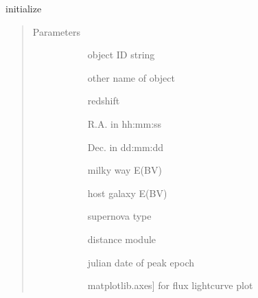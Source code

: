 \documentclass[letterpaper,10pt,english]{sphinxmanual}
\begin{document}
\begin{fulllineitems}
\begin{fulllineitems}
\label{\detokenize{generated/sdapy.snerun.snobject:sdapy.snerun.snobject.__init__}}
initialize 
\begin{quote}\begin{description}
\item[{Parameters}] \leavevmode\begin{description}
\item[{}] \leavevmode{[}\sphinxtitleref{str}{]}
object ID string

\item[{}] \leavevmode{[}\sphinxtitleref{str}{]}
other name of object

\item[{}] \leavevmode{[}\sphinxtitleref{float}{]}
redshift

\item[{}] \leavevmode{[}\sphinxtitleref{str}{]}
R.A. in hh:mm:ss

\item[{}] \leavevmode{[}\sphinxtitleref{str}{]}
Dec. in dd:mm:dd

\item[{}] \leavevmode{[}\sphinxtitleref{float}{]}
milky way E(B\sphinxhyphen{}V)

\item[{}] \leavevmode{[}\sphinxtitleref{float}{]}
host galaxy E(B\sphinxhyphen{}V)

\item[{}] \leavevmode{[}\sphinxtitleref{str}{]}
supernova type

\item[{}] \leavevmode{[}\sphinxtitleref{float}{]}
distance module

\item[{}] \leavevmode{[}\sphinxtitleref{float}{]}
julian date of peak epoch

\item[{}] \leavevmode{[}matplotlib.axes{]}
for flux lightcurve plot


\end{description}
\end{description}
\end{quote}
\end{fulllineitems}
\end{fulllineitems}
\end{document}
